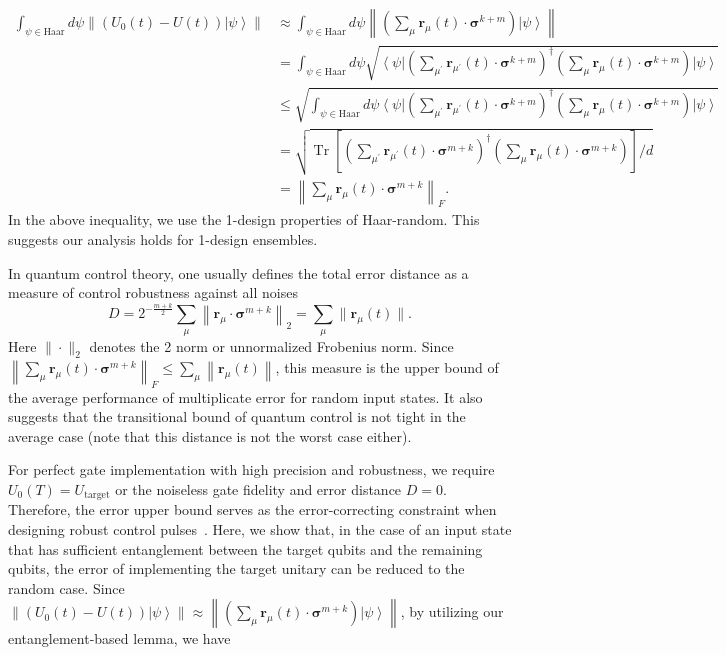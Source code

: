 \documentclass[12pt]{article}
\newcommand{\ket}[1]{\left|#1\right\rangle}
\newcommand{\bra}[1]{\left\langle #1\right|}
\newcommand{\norm}[1]{\left\lVert #1\right\rVert}
\newcommand{\Tr}{\operatorname{Tr}}
\begin{document}
\begin{equation}
\begin{split}
      \int_{\psi\in \text{Haar}} d\psi \norm{ (U_0(t)-U(t))\ket{\psi}}&\approx   \int_{\psi\in \text{Haar}} d\psi \norm{(\sum_{\mu}\mathbf{r}_\mu(t)\cdot \boldsymbol{\sigma}^{k+m}) \ket{\psi}}\\
      &=\int_{\psi\in \text{Haar}} d\psi \sqrt{\bra{\psi}(\sum_{\mu^\prime}\mathbf{r}_{\mu^\prime}(t)\cdot \boldsymbol{\sigma}^{k+m}) ^\dagger (\sum_{\mu}\mathbf{r}_\mu(t)\cdot \boldsymbol{\sigma}^{k+m}) \ket{\psi}}\\
      &\le\sqrt{ \int_{\psi\in \text{Haar}} d\psi \bra{\psi}(\sum_{\mu^\prime}\mathbf{r}_{\mu^\prime}(t)\cdot \boldsymbol{\sigma}^{k+m}) ^\dagger (\sum_{\mu}\mathbf{r}_\mu(t)\cdot \boldsymbol{\sigma}^{k+m}) \ket{\psi}}\\
      &=\sqrt{\Tr[(\sum_{\mu^\prime}\mathbf{r}_{\mu^\prime}(t)\cdot \boldsymbol{\sigma}^{m+k}) ^\dagger (\sum_{\mu}\mathbf{r}_\mu(t)\cdot \boldsymbol{\sigma}^{m+k})]/d}\\
      &= \norm{\sum_{\mu}\mathbf{r}_\mu(t)\cdot \boldsymbol{\sigma}^{m+k}}_F.
\end{split}
\end{equation}
 In the above inequality, we use the 1-design properties of Haar-random. This suggests our analysis holds for 1-design ensembles.

In quantum control theory, one usually defines the total error distance as a measure of control robustness against all noises
\begin{equation}
D = 2^{-\frac{m+k}{2}} \sum_\mu \left\|\mathbf{r}_\mu\cdot \boldsymbol{\sigma}^{m+k}\right\|_{\text{2}}
= \sum_\mu \|\mathbf{r}_\mu(t)\|.
\end{equation}
Here $\|\cdot\|_{\text{2}}$ denotes the 2 norm or unnormalized Frobenius norm. Since $\norm{\sum_{\mu}\mathbf{r}_\mu(t)\cdot \boldsymbol{\sigma}^{m+k}}_F \le \sum_\mu \norm{\mathbf{r}_\mu(t)}$, this measure is the upper bound of the average performance of multiplicate error for random input states. It also suggests that the transitional bound of quantum control is not tight in the average case (note that this distance is not the worst case either).


For perfect gate implementation with high precision and robustness, we require $U_0(T) = U_{\text{target}}$ or the noiseless gate fidelity and error distance $D=0$. 
Therefore, the error upper bound serves as the error-correcting constraint when designing robust control pulses~\cite{xue2025quantum}.
Here, we show that, in the case of an input state that has sufficient entanglement between the target qubits and the remaining qubits, the error of implementing the target unitary can be reduced to the random case. Since 
$       \norm{ (U_0(t)-U(t))\ket{\psi}} \approx\norm{(\sum_{\mu}\mathbf{r}_\mu(t)\cdot \boldsymbol{\sigma}^{m+k}) \ket{\psi}}$, by utilizing our entanglement-based lemma,
we have
\end{document}

